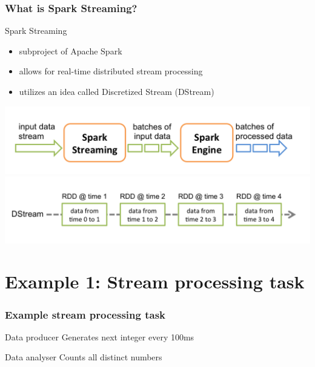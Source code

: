\documentclass{beamer}
\begin{document}
\begin{frame}
\frametitle{What is Spark Streaming?}

\begin{block}{Spark Streaming}
\begin{itemize}
	\item subproject of Apache Spark\texttrademark
	\item allows for real-time distributed stream processing
	\item utilizes an idea called Discretized Stream (DStream)
\end{itemize}
\vspace{-1em}
\includegraphics[width=\textwidth]{img/streaming-flow.png}
\vspace{-1em}
\includegraphics[width=\textwidth]{img/streaming-dstream.png}

\end{block}
\end{frame}

\section{Example 1: Stream processing task}
\begin{frame}
\frametitle{Example stream processing task}
\begin{block}{Data producer}
	Generates next integer every 100ms
\end{block}
\begin{block}{Data analyser}
	Counts all distinct numbers
\end{block}
\end{frame}
\end{document}
